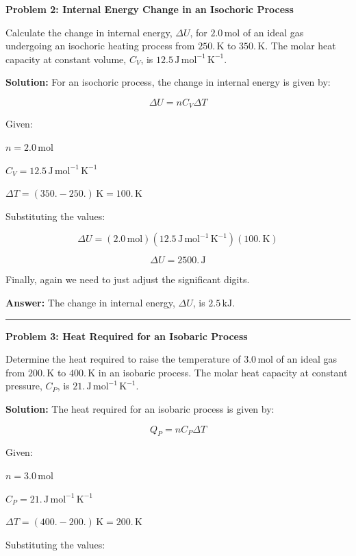 \documentclass[
  9pt,
]{extbook}
\theoremstyle{definition}
\theoremstyle{definition}
\theoremstyle{definition}
\theoremstyle{remark}
\begin{document}
\textbf{Problem 2: Internal Energy Change in an Isochoric Process}

Calculate the change in internal energy, \(\Delta U\), for \(2.0 \, \text{mol}\) of an ideal gas undergoing an isochoric heating process from \(250. \, \text{K}\) to \(350. \, \text{K}\). The molar heat capacity at constant volume, \(C_V\), is \(12.5 \, \text{J} \, \text{mol}^{-1} \, \text{K}^{-1}\).

\textbf{Solution:} For an isochoric process, the change in internal energy is given by:

\[ \Delta U = n C_V \Delta T \]

Given:

\(n = 2.0 \, \text{mol}\)

\(C_V = 12.5 \, \text{J} \, \text{mol}^{-1} \, \text{K}^{-1}\)

\(\Delta T = (350. - 250.) \, \text{K} = 100. \, \text{K}\)

Substituting the values:

\[ \Delta U = (2.0\, \text{mol})(12.5\, \text{J} \, \text{mol}^{-1} \, \text{K}^{-1}) (100.\,\text{K}) \]

\[ \Delta U = 2500. \, \text{J} \]

Finally, again we need to just adjust the significant digits.

\textbf{Answer:} The change in internal energy, \(\Delta U\), is \(2.5 \, \text{kJ}\).

\begin{center}\rule{0.5\linewidth}{0.5pt}\end{center}

\textbf{Problem 3: Heat Required for an Isobaric Process}

Determine the heat required to raise the temperature of \(3.0 \, \text{mol}\) of an ideal gas from \(200. \, \text{K}\) to \(400. \, \text{K}\) in an isobaric process. The molar heat capacity at constant pressure, \(C_P\), is \(21. \, \text{J} \, \text{mol}^{-1} \, \text{K}^{-1}\).

\textbf{Solution:} The heat required for an isobaric process is given by:

\[ Q_P = n C_P \Delta T \]

Given:

\(n = 3.0 \, \text{mol}\)

\(C_P = 21. \, \text{J} \, \text{mol}^{-1} \, \text{K}^{-1}\)

\(\Delta T = (400. - 200.) \, \text{K} = 200. \, \text{K}\)

Substituting the values:
\end{document}
